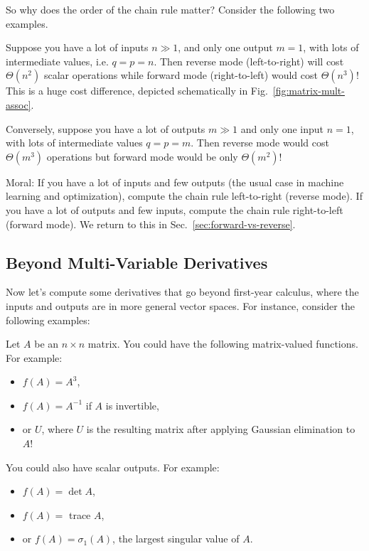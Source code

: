So why does the order of the chain rule matter? Consider the following two examples.
\begin{example}
    Suppose you have a lot of inputs $n \gg 1$, and only one output $m=1$, with lots of intermediate values, i.e. $q=p=n$. Then reverse mode (left-to-right) will cost $\Theta(n^2)$ scalar operations while forward mode (right-to-left) would cost $\Theta(n^3)$! This is a huge cost difference, depicted schematically in Fig.~\ref{fig:matrix-mult-assoc}.

    Conversely, suppose you have a lot of outputs $m \gg 1$ and only one input $n=1$, with lots of intermediate values $q=p=m$.  Then reverse mode would cost $\Theta(m^3)$ operations but forward mode would be only $\Theta(m^2)$!

    Moral: If you have a lot of inputs and few outputs (the usual case in machine learning and optimization), compute the chain rule left-to-right (reverse mode).  If you have a lot of outputs and few inputs, compute the chain rule right-to-left (forward mode).  We return to this in Sec.~\ref{sec:forward-vs-reverse}.
\end{example}

\subsection{Beyond Multi-Variable Derivatives}

Now let's compute some derivatives that go beyond first-year calculus, where the inputs and outputs are in more general vector spaces. For instance, consider the following examples:

\begin{example}
    Let $A$ be an $n\times n$ matrix. You could have the following matrix-valued functions. For example:
\begin{itemize}
    \item $f(A) = A^3$,
    \item $f(A) = A^{-1}$ if $A$ is invertible,
    \item or $U$, where $U$ is the resulting matrix after applying Gaussian elimination to $A$!
\end{itemize}

\noindent You could also have scalar outputs. For example:
\begin{itemize}
    \item $f(A) = \det A$,
    \item $f(A) =$ trace $A$,
    \item or $f(A) = \sigma_1(A)$, the largest singular value of $A$.
\end{itemize}
\end{example}

